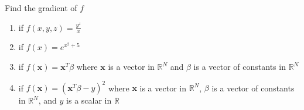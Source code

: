 Find the gradient of $f$  
\begin{enumerate}
        \item if  $f(x,y,z) = \frac{y^z}{x}$ 
        \item if  $f(x) = e^{x^2+5}$ 
        \item if  $f(\mathbf{x}) = \mathbf{x}^T\beta$  where
                 $\mathbf{x}$  is a vector in  $\mathbb{R}^N$  and
                 $\beta$  is a vector of constants in  
                $\mathbb{R}^N$
	\item if $f(\mathbf{x})= (\mathbf{x}^T\beta - y)^2$ where 
		$\mathbf{x}$ is a vector in $\mathbb{R}^N$, 
		$\beta$ is a vector of constants in $\mathbb{R}^N$,
		and $y$ is a scalar in $\mathbb{R}$
\end{enumerate} 

